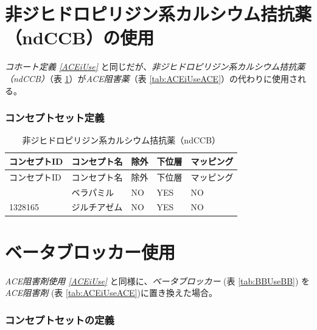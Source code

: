 \documentclass[
  11pt]{book}
\theoremstyle{definition}
\theoremstyle{definition}
\theoremstyle{definition}
\theoremstyle{definition}
\theoremstyle{remark}
\begin{document}
\section{非ジヒドロピリジン系カルシウム拮抗薬（ndCCB）の使用}\label{ndCCBUse}

\emph{コホート定義 \ref{ACEiUse}} と同じだが、\emph{非ジヒドロピリジン系カルシウム拮抗薬（ndCCB）}（表 \ref{tab:ndCCBUsendCCB}）が\emph{ACE阻害薬}（表 \ref{tab:ACEiUseACE}）の代わりに使用される。

\subsubsection*{コンセプトセット定義}\label{ux30b3ux30f3ux30bbux30d7ux30c8ux30bbux30c3ux30c8ux5b9aux7fa9-8}

\begin{longtable}[]{@{}lllll@{}}
\caption{\label{tab:ndCCBUsendCCB} 非ジヒドロピリジン系カルシウム拮抗薬（ndCCB）}\tabularnewline
\toprule\noalign{}
コンセプトID & コンセプト名 & 除外 & 下位層 & マッピング \\
\midrule\noalign{}
\endfirsthead
\toprule\noalign{}
コンセプトID & コンセプト名 & 除外 & 下位層 & マッピング \\
\midrule\noalign{}
\endhead
\bottomrule\noalign{}
\endlastfoot
1307863 & ベラパミル & NO & YES & NO \\
1328165 & ジルチアゼム & NO & YES & NO \\
\end{longtable}

\section{ベータブロッカー使用}\label{BBUse}

\emph{ACE阻害剤使用 \ref{ACEiUse}} と同様に、\emph{ベータブロッカー} (表 \ref{tab:BBUseBB}) を \emph{ACE阻害剤} (表 \ref{tab:ACEiUseACE})に置き換えた場合。

\subsubsection*{コンセプトセットの定義}\label{ux30b3ux30f3ux30bbux30d7ux30c8ux30bbux30c3ux30c8ux306eux5b9aux7fa9-3}
\end{document}
